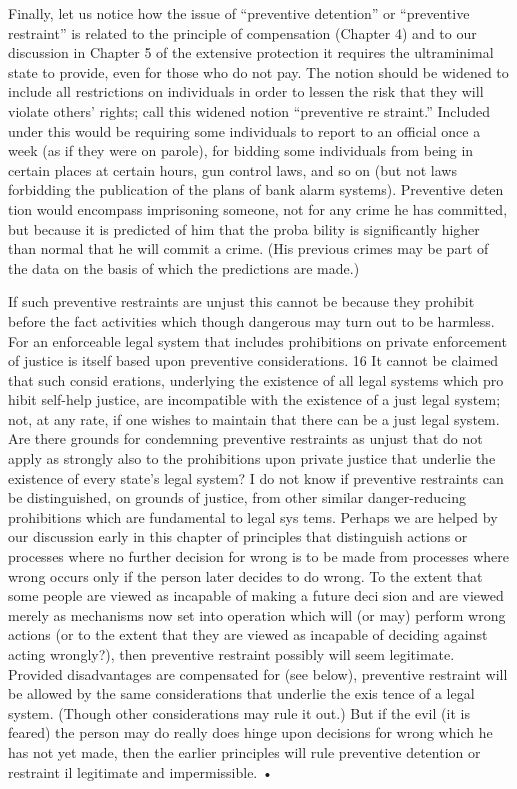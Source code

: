 \documentclass[11pt,openany]{book}
\begin{document}
Finally, let us notice how the issue of ``preventive detention'' or ``preventive restraint'' is related to the principle of compensation (Chapter 4) and to our discussion in Chapter 5 of the extensive protection it requires the ultraminimal state to provide, even for those who do not pay. The notion should be widened to include all restrictions on individuals in order to lessen the risk that they will violate others' rights; call this widened notion ``preventive re straint.'' Included under this would be requiring some individuals to report to an official once a week (as if they were on parole), for bidding some individuals from being in certain places at certain hours, gun control laws, and so on (but not laws forbidding the publication of the plans of bank alarm systems). Preventive deten tion would encompass imprisoning someone, not for any crime he has committed, but because it is predicted of him that the proba bility is significantly higher than normal that he will commit a crime. (His previous crimes may be part of the data on the basis of which the predictions are made.) 

If such preventive restraints are unjust this cannot be because they prohibit before the fact activities which though dangerous may turn out to be harmless. For an enforceable legal system that includes prohibitions on private enforcement of justice is itself based upon preventive considerations. 16 It cannot be claimed that such consid erations, underlying the existence of all legal systems which pro hibit self-help justice, are incompatible with the existence of a just legal system; not, at any rate, if one wishes to maintain that there can be a just legal system. Are there grounds for condemning preventive restraints as unjust that do not apply as strongly also to the prohibitions upon private justice that underlie the existence of every state's legal system? I do not know if preventive restraints can be distinguished, on grounds of justice, from other similar danger-reducing prohibitions which are fundamental to legal sys tems. Perhaps we are helped by our discussion early in this chapter of principles that distinguish actions or processes where no further decision for wrong is to be made from processes where wrong occurs only if the person later decides to do wrong. To the extent that some people are viewed as incapable of making a future deci sion and are viewed merely as mechanisms now set into operation which will (or may) perform wrong actions (or to the extent that they are viewed as incapable of deciding against acting wrongly?), then preventive restraint possibly will seem legitimate. Provided disadvantages are compensated for (see below), preventive restraint will be allowed by the same considerations that underlie the exis tence of a legal system. (Though other considerations may rule it out.) But if the evil (it is feared) the person may do really does hinge upon decisions for wrong which he has not yet made, then the earlier principles will rule preventive detention or restraint il legitimate and impermissible. • 
\end{document}
